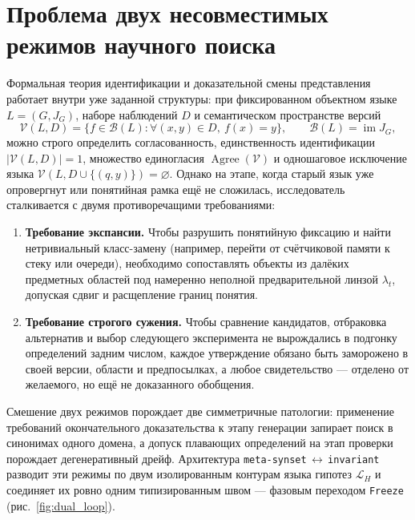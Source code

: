 \documentclass[11pt,a4paper]{article}
\theoremstyle{preprintthm}
\theoremstyle{preprintdef}
\newcommand{\LH}{\mathcal{L}_H}
\newcommand{\calB}{\mathcal{B}}
\newcommand{\calV}{\mathcal{V}}
\newcommand{\Agree}{\operatorname{Agree}}
\newcommand{\im}{\operatorname{im}}
\begin{document}
\section{Проблема двух несовместимых режимов научного поиска}

Формальная теория идентификации и доказательной смены представления~\cite{strand2026hl,angluin1987} работает внутри уже заданной структуры: при фиксированном объектном языке $L=(G,J_G)$, наборе наблюдений $D$ и семантическом пространстве версий
\begin{equation}
  \calV(L,D) = \{f \in \calB(L) : \forall (x,y)\in D,\ f(x)=y\}, \qquad \calB(L)=\im J_G,
\end{equation}
можно строго определить согласованность, единственность идентификации $|\calV(L,D)|=1$, множество единогласия $\Agree(\calV)$ и одношаговое исключение языка $\calV(L,D\cup\{(q,y)\})=\varnothing$. Однако на этапе, когда старый язык уже опровергнут или понятийная рамка ещё не сложилась, исследователь сталкивается с двумя противоречащими требованиями:

\begin{enumerate}
  \item \textbf{Требование экспансии.} Чтобы разрушить понятийную фиксацию и найти нетривиальный класс-замену (например, перейти от счётчиковой памяти к стеку или очереди), необходимо сопоставлять объекты из далёких предметных областей под намеренно неполной предварительной линзой $\lambda_t$, допуская сдвиг и расщепление границ понятия.
  \item \textbf{Требование строгого сужения.} Чтобы сравнение кандидатов, отбраковка альтернатив и выбор следующего эксперимента не вырождались в подгонку определений задним числом, каждое утверждение обязано быть заморожено в своей версии, области и предпосылках, а любое свидетельство --- отделено от желаемого, но ещё не доказанного обобщения.
\end{enumerate}

Смешение двух режимов порождает две симметричные патологии: применение требований окончательного доказательства к этапу генерации запирает поиск в синонимах одного домена, а допуск плавающих определений на этап проверки порождает дегенеративный дрейф. Архитектура \texttt{meta-synset}\,$\leftrightarrow$\,\texttt{invariant} разводит эти режимы по двум изолированным контурам языка гипотез $\LH$ и соединяет их ровно одним типизированным швом --- фазовым переходом \texttt{Freeze} (рис.~\ref{fig:dual_loop}).
\end{document}
